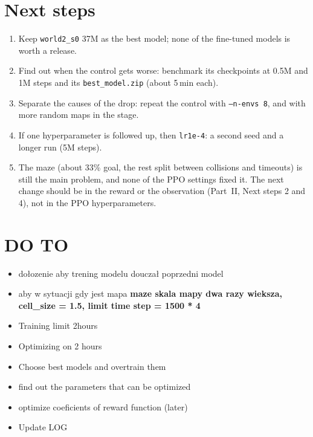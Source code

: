 \documentclass[11pt,a4paper]{article}
\newcommand{\code}[1]{\texttt{#1}}
\begin{document}
\section{Next steps}
\begin{enumerate}[leftmargin=*]
      \item Keep \code{world2\_s0} 37M as the best model; none of the fine-tuned models
            is worth a release.
      \item Find out when the control gets worse: benchmark its checkpoints at 0.5M
            and 1M steps and its \code{best\_model.zip} (about 5\,min each).
      \item Separate the causes of the drop: repeat the control with
            \code{--n-envs 8}, and with more random maps in the stage.
      \item If one hyperparameter is followed up, then \code{lr1e-4}: a second seed
            and a longer run (5M steps).
      \item The maze (about 33\% goal, the rest split between collisions and timeouts)
            is still the main problem, and none of the PPO settings fixed it. The next
            change should be in the reward or the observation (Part~II, Next steps 2
            and 4), not in the PPO hyperparameters.
\end{enumerate}

\section{DO TO}
\begin{itemize}
      \item dołozenie aby trening modelu douczał poprzedni model
      \item aby w sytuacji gdy jest mapa \bf{maze} skala mapy dwa razy wieksza, cell\_size
            = 1.5, limit time step = 1500 * 4
      \item Training limit 2hours
      \item Optimizing on 2 hours
      \item Choose best models and overtrain them
      \item find out the parameters that can be optimized
      \item optimize coeficients of reward function (later)

      \item Update LOG
\end{itemize}
\end{document}
